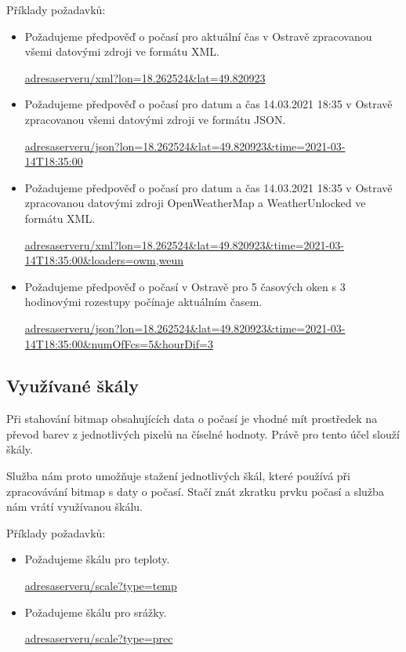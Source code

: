 \documentclass[czech,bachelor,dept460,male,csharp,cpdeclaration]{diploma}
\begin{document}
	Příklady požadavků:
	\begin{itemize}
		\item Požadujeme předpověď o počasí pro aktuální čas v Ostravě zpracovanou všemi datovými zdroji ve formátu XML.
		
		\url{adresaserveru/xml?lon=18.262524\&lat=49.820923}
		
		\item Požadujeme předpověď o počasí pro datum a čas 14.03.2021 18:35 v Ostravě zpracovanou všemi datovými zdroji ve formátu JSON.
		
		\url{adresaserveru/json?lon=18.262524\&lat=49.820923\&time=2021-03-14T18:35:00}
		
		\item Požadujeme předpověď o počasí pro datum a čas 14.03.2021 18:35 v Ostravě zpracovanou datovými zdroji OpenWeatherMap a WeatherUnlocked ve formátu XML.
		
		\url{adresaserveru/xml?lon=18.262524\&lat=49.820923\&time=2021-03-14T18:35:00\&loaders=owm,weun}
		
		\item Požadujeme předpověď o počasí v Ostravě pro 5 časových oken s 3 hodinovými rozestupy počínaje aktuálním časem.
		
		\url{adresaserveru/json?lon=18.262524\&lat=49.820923\&time=2021-03-14T18:35:00\&numOfFcs=5\&hourDif=3}
		
	\end{itemize}
	
	\subsection{Využívané škály}
	
	Při stahování bitmap obsahujících data o počasí je vhodné mít prostředek na převod barev z jednotlivých pixelů na číselné hodnoty. Právě pro tento účel slouží škály.
	
	Služba nám proto umožňuje stažení jednotlivých škál, které používá při zpracovávání bitmap s daty o počasí. Stačí znát zkratku prvku počasí a služba nám vrátí využívanou škálu.
	
	Příklady požadavků:
	\begin{itemize}
		\item Požadujeme škálu pro teploty.
		
		\url{adresaserveru/scale?type=temp}
		
		\item Požadujeme škálu pro srážky.
		
		\url{adresaserveru/scale?type=prec}
		
	\end{itemize}
	
\end{document}

